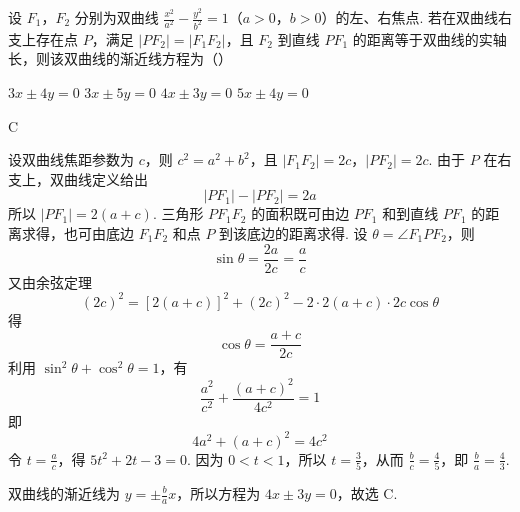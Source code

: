 \begin{problem}
设 \(F_{1}\)，\(F_{2}\) 分别为双曲线 \(\frac{x^2}{a^2} - \frac{y^2}{b^2} = 1\)（\(a > 0\)，\(b > 0\)）的左、右焦点. 若在双曲线右支上存在点 \(P\)，满足 \(|PF_{2}| = |F_{1}F_{2}|\)，且 \(F_{2}\) 到直线 \(PF_{1}\) 的距离等于双曲线的实轴长，则该双曲线的渐近线方程为（\quad）

\choices
    {\(3x \pm 4y = 0\)}
    {\(3x \pm 5y = 0\)}
    {\(4x \pm 3y = 0\)}
    {\(5x \pm 4y = 0\)}
\begin{answer}
C
\end{answer}

\begin{solution}
设双曲线焦距参数为 \(c\)，则 \(c^2=a^2+b^2\)，且
\(|F_1F_2|=2c\)，\(|PF_2|=2c\).
由于 \(P\) 在右支上，双曲线定义给出
\[
|PF_1|-|PF_2|=2a
\]
所以 \(|PF_1|=2(a+c)\). 三角形 \(PF_1F_2\) 的面积既可由边 \(PF_1\) 和到直线 \(PF_1\) 的距离求得，也可由底边 \(F_1F_2\) 和点 \(P\) 到该底边的距离求得. 设 \(\theta=\angle F_1PF_2\)，则
\[
\sin\theta=\frac{2a}{2c}=\frac ac
\]
又由余弦定理
\[
(2c)^2=[2(a+c)]^2+(2c)^2-2\cdot2(a+c)\cdot2c\cos\theta
\]
得
\[
\cos\theta=\frac{a+c}{2c}
\]
利用 \(\sin^2\theta+\cos^2\theta=1\)，有
\[
\frac{a^2}{c^2}+\frac{(a+c)^2}{4c^2}=1
\]
即
\[
4a^2+(a+c)^2=4c^2
\]
令 \(t=\frac ac\)，得 \(5t^2+2t-3=0\). 因为 \(0<t<1\)，所以 \(t=\frac35\)，从而 \(\frac{b}{c}=\frac45\)，即 \(\frac{b}{a}=\frac43\).

双曲线的渐近线为 \(y=\pm\frac ba x\)，所以方程为 \(4x\pm3y=0\)，故选 C.
\end{solution}
\end{problem}

